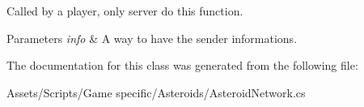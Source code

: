 Called by a player, only server do this function. 


\begin{DoxyParams}{Parameters}
{\em info} & A way to have the sender informations.\\
\hline
\end{DoxyParams}


The documentation for this class was generated from the following file\-:\begin{DoxyCompactItemize}
\item 
Assets/\-Scripts/\-Game specific/\-Asteroids/Asteroid\-Network.\-cs\end{DoxyCompactItemize}
